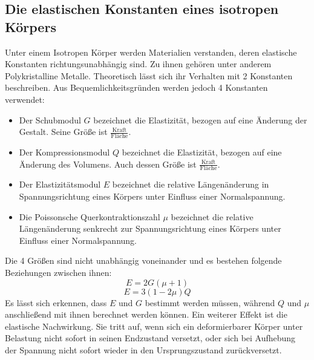 \subsection{Die elastischen Konstanten eines isotropen Körpers}
Unter einem Isotropen Körper werden Materialien verstanden,
 deren elastische Konstanten richtungsunabhängig sind. Zu ihnen gehören
  unter anderem Polykristalline Metalle. Theoretisch lässt sich ihr Verhalten
  mit 2 Konstanten beschreiben. Aus Bequemlichkeitsgründen werden jedoch 4 Konstanten verwendet:
  \begin{itemize}
    \item Der Schubmodul $G$ bezeichnet die Elastizität, bezogen auf eine Änderung
     der Gestalt. Seine Größe ist $\frac{\text{Kraft}}{\text{Fläche}}$.

    \item Der Kompressionsmodul $Q$ bezeichnet die Elastizität, bezogen auf
     eine Änderung des Volumens. Auch dessen Größe ist $\frac{\text{Kraft}}{\text{Fläche}}$.

    \item Der Elastizitätsmodul $E$ bezeichnet die relative Längenänderung in
     Spannungsrichtung eines Körpers unter Einfluss einer Normalspannung.

    \item Die Poissonsche Querkontraktionszahl $\mu$ bezeichnet die relative
     Längenänderung senkrecht zur Spannungsrichtung eines Körpers unter
      Einfluss einer Normalspannung.
\end{itemize}
Die 4 Größen sind nicht unabhängig voneinander und es bestehen folgende Beziehungen zwischen ihnen:
\begin{equation}
  E = 2G(\mu + 1)
\end{equation}
\begin{equation}
  E = 3(1-2\mu)Q
\end{equation}
Es lässt sich erkennen, dass $E$ und $G$ bestimmt werden müssen, während $Q$ und $\mu$
 anschließend mit ihnen berechnet werden können. Ein weiterer Effekt ist die
  elastische Nachwirkung. Sie tritt auf, wenn sich ein deformierbarer Körper
   unter Belastung nicht sofort in seinen Endzustand versetzt, oder sich bei
    Aufhebung der Spannung nicht sofort wieder in den Ursprungszustand zurückversetzt.

